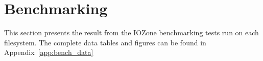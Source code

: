 \section{Benchmarking}
\label{sec:res_bench}
This section presents the result from the IOZone benchmarking tests run on each filesystem. The complete data tables and figures can be found in Appendix~\ref{app:bench_data}


